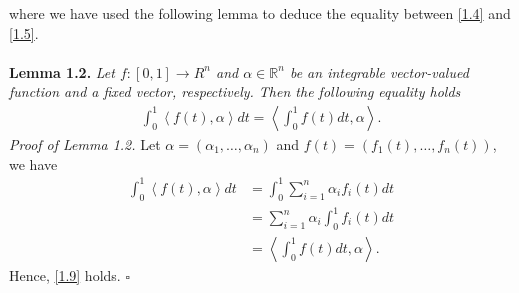 \documentclass[a4paper]{article}
\numberwithin{equation}{section}
\begin{document}
where we have used the following lemma to deduce the equality between \eqref{1.4} and \eqref{1.5}.\\
\\
\textbf{Lemma 1.2.} \textit{Let $f:\left[ {0,1} \right] \to {R^n}$ and $\alpha \in \mathbb{R}^n$ be an integrable vector-valued function and a fixed vector, respectively. Then the following equality holds}
\begin{align}
\label{1.9}
\int_0^1 {\left\langle {f\left( t \right),\alpha } \right\rangle dt}  = \left\langle {\int_0^1 {f\left( t \right)dt} ,\alpha } \right\rangle .
\end{align}
\textit{Proof of Lemma 1.2.} Let $\alpha  = \left( {{\alpha _1}, \ldots ,{\alpha _n}} \right)$ and $f\left( t \right) = \left( {{f_1}\left( t \right), \ldots ,{f_n}\left( t \right)} \right)$, we have
\begin{align}
\int_0^1 {\left\langle {f\left( t \right),\alpha } \right\rangle dt}  &= \int_0^1 {\sum\limits_{i = 1}^n {{\alpha _i}{f_i}\left( t \right)} dt} \\
 &= \sum\limits_{i = 1}^n {{\alpha _i}\int_0^1 {{f_i}\left( t \right)dt} } \\
 &= \left\langle {\int_0^1 {f\left( t \right)dt} ,\alpha } \right\rangle .
\end{align}
Hence, \eqref{1.9} holds. \hfill $\square$\\
\end{document}
